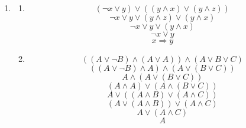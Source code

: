 \documentclass[a4paper]{article}
\begin{document}
	\begin{enumerate}
		\item
		\begin{enumerate}
			\item
			\begin{equation*}
				(\lnot x \lor y) \lor ((y \land x) \lor (y \land z))
			\end{equation*}
			\begin{equation*}
				\lnot x \lor y \lor (y \land z) \lor (y \land x)
			\end{equation*}
			\begin{equation*}
				\lnot x \lor y \lor (y \land x)
			\end{equation*}
			\begin{equation*}
				\lnot x \lor y
			\end{equation*}
			\begin{equation*}
				x \Rightarrow y
			\end{equation*}
			
			\item
			\begin{equation*}
				((A \lor \lnot B) \land (A \lor A)) \land (A \lor B \lor C)
			\end{equation*}
			\begin{equation*}
				((A \lor \lnot B) \land A) \land (A \lor (B \lor C))
			\end{equation*}
			\begin{equation*}
				A \land (A \lor (B \lor C))
			\end{equation*}
			\begin{equation*}
				(A \land A) \lor (A \land (B \lor C))
			\end{equation*}
			\begin{equation*}
				A \lor ((A \land B) \lor (A \land C))
			\end{equation*}
			\begin{equation*}
				(A \lor (A \land B)) \lor (A \land C)
			\end{equation*}
			\begin{equation*}
				A \lor (A \land C)
			\end{equation*}
			\begin{equation*}
				A
			\end{equation*}
		\end{enumerate}
		

\end{enumerate}
\end{document}
